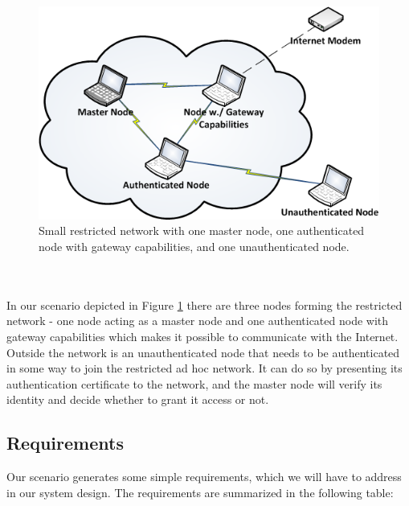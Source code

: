 \begin{figure}[ht!]
  \centering
  \includegraphics{images/our_scenario.png}
  \caption{Small restricted network with one master node, one authenticated node with gateway capabilities, and one unauthenticated node.}
  \label{fig:our_scenario}
\end{figure}
\noindent
\\\\
In our scenario depicted in Figure \ref{fig:our_scenario} there are three nodes forming the restricted network - one node acting as a master node and one authenticated node with gateway capabilities which makes it possible to communicate with the Internet. Outside the network is an unauthenticated node that needs to be authenticated in some way to join the restricted ad hoc network. It can do so by presenting its authentication certificate to the network, and the master node will verify its identity and decide whether to grant it access or not.

\subsection{Requirements}\label{our_requirements}
Our scenario generates some simple requirements, which we will have to address in our system design. The requirements are summarized in the following table:

